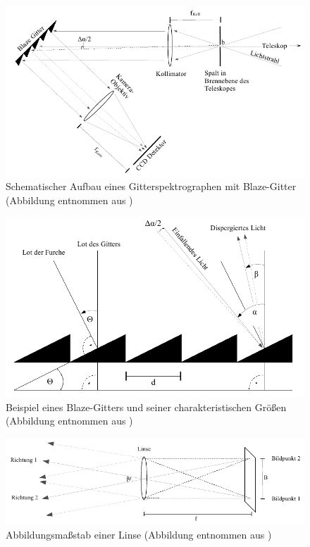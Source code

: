 \begin{figure}
		\includegraphics[width=.9\textwidth]{images/Abbildung101}
\caption{ Schematischer Aufbau eines Gitterspektrographen mit Blaze-Gitter (Abbildung entnommen aus \cite{ronomischesPraktikum})}
\label{fig:101}
\end{figure}
\begin{figure}

        \includegraphics[width=.9\textwidth]{images/Abbildung102.png}
\caption{ Beispiel eines Blaze-Gitters und seiner charakteristischen Größen (Abbildung entnommen aus \cite{ronomischesPraktikum}) }
\label{fig:102}
\end{figure}
\begin{figure}

        \includegraphics[width=.9\textwidth]{images/Abbildung103.png}
\caption{ Abbildungsmaßstab einer Linse (Abbildung entnommen aus \cite{ronomischesPraktikum})}
\label{fig:103}
\end{figure}

